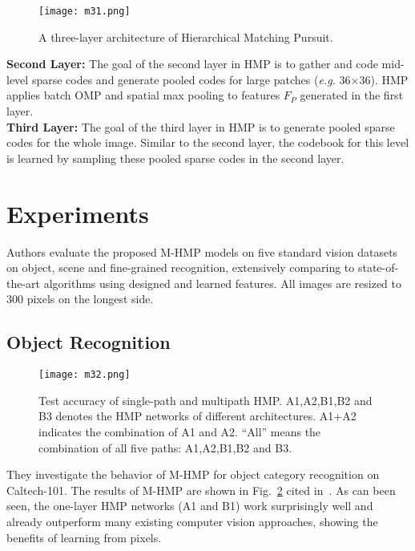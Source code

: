 \documentclass[10pt,twocolumn,letterpaper]{article}
\begin{document}
\begin{figure}
\begin{center}
\texttt{[image: m31.png]}
\end{center}
\caption{A three-layer architecture of Hierarchical Matching Pursuit.}
\label{fig1}
\end{figure}
{\bf Second Layer:} The goal of the second layer in HMP is to gather and code mid-level sparse codes and generate pooled codes for large patches (\emph{e.g.} 36$\times$36). HMP applies batch OMP and spatial max pooling to features $F_P$ generated in the first layer.\\
{\bf Third Layer:} The goal of the third layer in HMP is to generate pooled sparse codes for the whole image. Similar to the second layer, the codebook for this level is learned by sampling these pooled sparse codes in the second layer.

\section{Experiments}

Authors evaluate the proposed M-HMP models on five standard vision datasets on object, scene and fine-grained recognition, extensively comparing to state-of-the-art algorithms using designed and learned features. All images are resized to 300 pixels on the longest side.

\balance

\subsection{Object Recognition}\label{2.1}

\begin{figure}
\begin{center}
\texttt{[image: m32.png]}
\end{center}
\caption{Test accuracy of single-path and multipath HMP. A1,A2,B1,B2 and B3 denotes the HMP networks of different architectures. A1+A2 indicates the combination of A1 and A2. ``All'' means the combination of all five paths: A1,A2,B1,B2 and B3.}
\label{fig2}
\end{figure}

They investigate the behavior of M-HMP for object category recognition on Caltech-101. The results of M-HMP are shown in Fig.~\ref{fig2} cited in~\cite{multipath}. As can been seen, the one-layer HMP networks (A1 and B1) work surprisingly well and already outperform many existing computer vision approaches, showing the benefits of learning from pixels.
\end{document}
